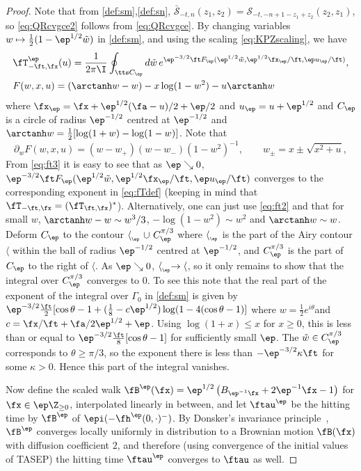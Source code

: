 \documentclass[]{pcmi}
\theoremstyle{plain}
\theoremstyle{definition}
\renewcommand{\SM}{\mathcal{S}}
\renewcommand{\SN}{\bar{\mathcal{S}}}
\begin{document}
\begin{proof}
Note that from  \eqref{def:sm},\eqref{def:sn}, $ \SN_{-t,n} (z_1,z_2)=  \SM_{-t,-n+1-z_1+z_2}(z_2,z_1)$, so \eqref{eq:QRcvgce2}
follows from  \eqref{eq:QRcvgce}.  
By changing variables $w\mapsto\frac12(1-\ep^{1/2}\tilde w)$ in \eqref{def:sm},  and using the scaling \eqref{eq:KPZscaling}, we have
\begin{align}
&\fT^\ep_{-\ft,\fx}(u)= \frac{1}{2\pi\I} \oint_{\tts C_\ep}d\tilde w\, e^{\ep^{-3/2}\ft F_\ep(\ep^{1/2} \tilde w,\ep^{1/2}\fx_\ep/\ft,\ep u_\ep/\ft ) } ,
\label{eq:ft1} \\\label{eq:ft2}
&F( w,x,u)= 
(  \arctanh w-w)-
 x\log(1- w^2) - u  \arctanh w
\end{align}
where $\fx_\ep= \fx+\ep^{1/2} (\fa-u)/2+\ep/2  $ and $u_\ep = u+\ep^{1/2} $  and $C_\ep $ is a circle of radius $\ep^{-1/2}$ centred at $\ep^{-1/2}$
and $\arctanh w = \tfrac12[\log(1+w)-\log(1-w)]$.  Note that 
\begin{equation}\label{eq:ft3}
\partial_w  F( w,x,u) =   ( w-w_+)(w-w_-)(1- w^2)^{-1},\qquad w_\pm = x \pm \sqrt{ x^2+ u},
\end{equation}
From \eqref{eq:ft3} it is easy to see that as $\ep\searrow 0$, $\ep^{-3/2}\ft F_\ep(\ep^{1/2} \tilde w,\ep^{1/2}\fx_\ep/\ft,\ep u_\ep/\ft )$  converges to the corresponding exponent in \eqref{eq:fTdef} (keeping in mind that $
\fT_{-\ft,\fx}=(\fT_{\ft,\fx})^*$).  Alternatively, one can just use \eqref{eq:ft2} and that for small $w$, $  \arctanh w-w\sim w^3/3$,
$-\log(1-w^2)\sim w^2$ and $\arctanh w\sim w$. Deform $C_\ep$ to the contour $\langle_{{}_\ep}~\cup~C^{\pi/3}_\ep$  where $\langle_{{}_\ep} $ is the part of the Airy contour $\langle$ within the ball of radius $\ep^{-1/2}$ centred at $\ep^{-1/2}$, and $C^{\pi/3}_\ep$ is the part of $C_\ep$ to the right of $\langle$.  
  As $\ep\searrow 0$, $\langle_{{}_\ep} \to \langle$, so it only remains to show that the integral over $C^{\pi/3}_\ep$ converges to $0$.
To see this note that the real part of the exponent of the integral over $\Gamma_0$ in \eqref{def:sm}  is given by $ \ep^{-3/2}\tfrac{\ft}2 [ \cos\theta -1 + (\tfrac18- c\ep^{1/2})\log( 1-4(\cos\theta -1)] $ where $w=\tfrac12 e^{i\theta}$and $c= \fx/\ft + \fa/2\ep^{1/2} +\ep$.  Using $\log(1+x) \le x$ for $x\ge 0$, this is less than or equal
to  $
\ep^{-3/2}\tfrac{\ft}8 [ \cos\theta -1] 
$ for sufficiently small $\ep$.  The  $\tilde{w}\in C^{\pi/3}_\ep$ corresponds to $\theta\ge \pi/3$, so the exponent there is less than $-\ep^{-3/2}\kappa\ft$ for some $\kappa>0$.  Hence this part of the integral vanishes.

Now define the scaled walk $\fB^\ep(\fx) = \ep^{1/2}\left(B_{\ep^{-1}\fx} + 2\ep^{-1}\fx-1\right)$ for $\fx\in \ep\Z_{\geq0}$, interpolated linearly in between, and let $\ftau^\ep$ be the hitting time by $\fB^\ep$ of $\epi(-\fh^{\ep}(0,\cdot)^-)$.
By Donsker's invariance principle~\cite{billingsley}, $\fB^\ep$ converges locally uniformly in distribution to a Brownian motion $\fB(\fx)$ with diffusion coefficient $2$, and therefore (using convergence of the initial values of TASEP) the hitting time $\ftau^\ep$ converges to $\ftau$ as well.
\end{proof}
\end{document}
